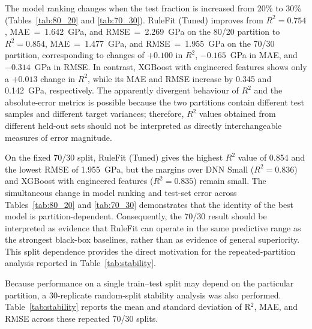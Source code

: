\documentclass[pdflatex,sn-mathphys-num]{sn-jnl}%
\theoremstyle{thmstyleone}%
\theoremstyle{thmstyletwo}%
\theoremstyle{thmstylethree}%
\begin{document}
The model ranking changes when the test fraction is increased from 20\% to 30\% (Tables~\ref{tab:80_20} and \ref{tab:70_30}). RuleFit (Tuned) improves from $R^2=0.754$, MAE~=~1.642~GPa, and RMSE~=~2.269~GPa on the 80/20 partition to $R^2=0.854$, MAE~=~1.477~GPa, and RMSE~=~1.955~GPa on the 70/30 partition, corresponding to changes of $+0.100$ in $R^2$, $-0.165$~GPa in MAE, and $-0.314$~GPa in RMSE. In contrast, XGBoost with engineered features shows only a $+0.013$ change in $R^2$, while its MAE and RMSE increase by 0.345 and 0.142~GPa, respectively. The apparently divergent behaviour of $R^2$ and the absolute-error metrics is possible because the two partitions contain different test samples and different target variances; therefore, $R^2$ values obtained from different held-out sets should not be interpreted as directly interchangeable measures of error magnitude.  

On the fixed 70/30 split, RuleFit (Tuned) gives the highest $R^2$ value of 0.854 and the lowest RMSE of 1.955~GPa, but the margins over DNN Small ($R^2=0.836$) and XGBoost with engineered features ($R^2=0.835$) remain small. The simultaneous change in model ranking and test-set error across Tables~\ref{tab:80_20} and \ref{tab:70_30} demonstrates that the identity of the best model is partition-dependent. Consequently, the 70/30 result should be interpreted as evidence that RuleFit can operate in the same predictive range as the strongest black-box baselines, rather than as evidence of general superiority. This split dependence provides the direct motivation for the repeated-partition analysis reported in Table~\ref{tab:stability}.

Because performance on a single train--test split may depend on the particular partition, a 30-replicate random-split stability analysis was also performed. Table~\ref{tab:stability} reports the mean and standard deviation of R$^2$, MAE, and RMSE across these repeated 70/30 splits.

\end{document}
